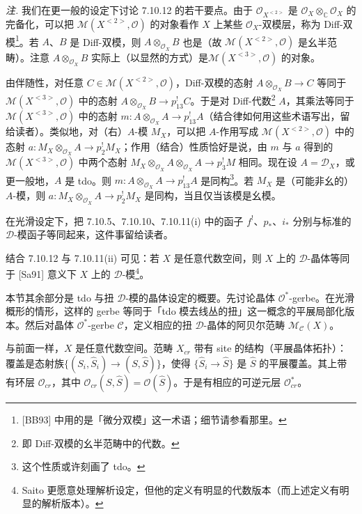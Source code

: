  \emph{注.} 我们在更一般的设定下讨论 7.10.12 的若干要点。由于 $\mathcal{O}_{X^{<2>}}$ 是 $\mathcal{O}_{X}\otimes_{\mathbb{C}}\mathcal{O}_{X}$ 的完备化，可以把 $\mathcal{M}(X^{<2>},\mathcal{O})$ 的对象看作 $X$ 上某些 $\mathcal{O}_{X}$-双模层，称为 Diff-双模\footnote{[BB93] 中用的是「微分双模」这一术语；细节请参看那里。}。若 $A$、$B$ 是 Diff-双模，则 $A\otimes_{\mathcal{O}_{X}}B$ 也是（故 $\mathcal{M}(X^{<2>},\mathcal{O})$ 是幺半范畴）。注意 $A\otimes_{\mathcal{O}_{X}}B$ 实际上（以显然的方式）是$\mathcal{M}(X^{<3>},\mathcal{O})$ 的对象。

由伴随性，对任意 $C\in\mathcal{M}(X^{<2>},\mathcal{O})$，Diff-双模的态射 $A\otimes_{\mathcal{O}_{X}}B\to C$ 等同于 $\mathcal{M}(X^{<3>},\mathcal{O})$ 中的态射 $A\otimes_{\mathcal{O}_{X}}B\to p^{!}_{13}C$。于是对 Diff-代数\footnote{即 Diff-双模的幺半范畴中的代数。} $A$，其乘法等同于 $\mathcal{M}(X^{<3>},\mathcal{O})$ 中的态射 $m:A\otimes_{\mathcal{O}_{X}}A\to p^{!}_{13}A$（结合律如何用这些术语写出，留给读者）。类似地，对（右）$A$-模 $M_{X}$，可以把 $A$-作用写成 $\mathcal{M}(X^{<2>},\mathcal{O})$ 中的态射 $a:M_{X}\otimes_{\mathcal{O}_{X}}A\to p^{!}_{2}M_{X}$；作用（结合）性质恰好是说，由 $m$ 与 $a$ 得到的 $\mathcal{M}(X^{<3>},\mathcal{O})$ 中两个态射 $M_{X}\otimes_{\mathcal{O}_{X}}A\otimes_{\mathcal{O}_{X}}A\to p^{!}_{3}M$ 相同。现在设 $A=\mathcal{D}_{X}$，或更一般地，$A$ 是 tdo。则 $m:A\otimes_{\mathcal{O}_{X}}A\to p^{!}_{13}A$ 是同构\footnote{这个性质或许刻画了 tdo。}。若 $M_{X}$ 是（可能非幺的）$A$-模，则 $a:M_{X}\otimes_{\mathcal{O}_{X}}A\to p^{!}_{2}M_{X}$ 是同构，当且仅当该模是幺模。

 在光滑设定下，把 7.10.5、7.10.10、7.10.11(i) 中的函子 $f^{!}$、$p_{*}$、$i_{*}$ 分别与标准的 $\mathcal{D}$-模函子等同起来，这件事留给读者。

结合 7.10.12 与 7.10.11(ii) 可见：若 $X$ 是任意代数空间，则 $X$ 上的 $\mathcal{D}$-晶体等同于 [Sa91] 意义下 $X$ 上的 $\mathcal{D}$-模\footnote{Saito 更愿意处理解析设定，但他的定义有明显的代数版本（而上述定义有明显的解析版本）。}。

 本节其余部分是 tdo 与扭 $\mathcal{D}$-模的晶体设定的概要。先讨论晶体 $\mathcal{O}^{*}$-gerbe。在光滑概形的情形，这样的 gerbe 等同于「tdo 模去线丛的扭」这一概念的平展局部化版本。然后对晶体 $\mathcal{O}^{*}$-gerbe $\mathcal{C}$，定义相应的扭 $\mathcal{D}$-晶体的阿贝尔范畴 $\mathcal{M}_{\mathcal{C}}(X)$。

 与前面一样，$X$ 是任意代数空间。范畴 $X_{cr}$ 带有 site 的结构（平展晶体拓扑）：覆盖是态射族$\{(S_{i},\hat S_{i})\to(S,\hat S)\}$，使得 $\{\hat S_{i}\to\hat S\}$ 是 $\hat S$ 的平展覆盖。其上带有环层 $\mathcal{O}_{cr}$，其中 $\mathcal{O}_{cr}(S,\hat S)=\mathcal{O}(\hat S)$。于是有相应的可逆元层 $\mathcal{O}^{*}_{cr}$。

